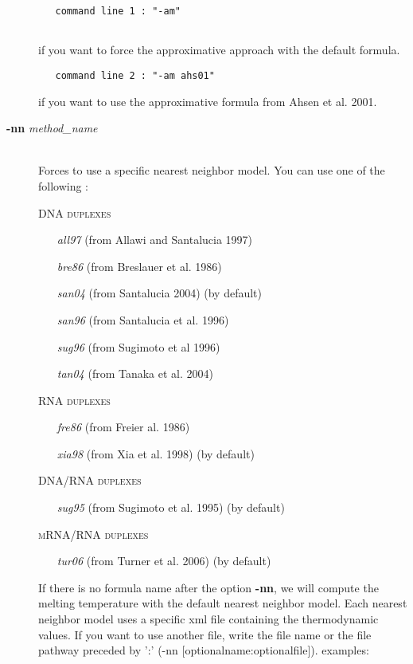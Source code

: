 \documentclass{article}
\begin{document}
\begin{description}
  \begin{verbatim}
   command line 1 : "-am" 
  
  \end{verbatim}	  
  if you want to force the approximative approach with the 
  default formula.
  
  \begin{verbatim}
   command line 2 : "-am ahs01" 
  \end{verbatim}
  	  
  if you want to use the approximative formula from 
  Ahsen et al. 2001.
    	
\item [\textbf{-nn} \textit{method\_name}]\mbox{}\\ 
  Forces to use a specific nearest neighbor model. You can use one of the following :
  
  \textsc{DNA duplexes}
    \begin{itemize}
    \item [\textit{all97}] (from Allawi and Santalucia 1997)
    \item [\textit{bre86}] (from Breslauer et al. 1986)
    \item [\textit{san04}] (from Santalucia 2004)  (by default)
    \item [\textit{san96}] (from Santalucia et al. 1996)
    \item [\textit{sug96}] (from Sugimoto et al 1996)
    \item [\textit{tan04}] (from Tanaka et al. 2004)		 
    \end{itemize}
  \textsc{RNA duplexes}
    \begin{itemize}
    \item [\textit{fre86}] (from Freier al. 1986)
    \item [\textit{xia98}] (from Xia et al. 1998)  (by default)		 
    \end{itemize}
  \textsc{DNA/RNA duplexes}
    \begin{itemize}
    \item [\textit{sug95}] (from Sugimoto et al. 1995)  (by default)
    \end{itemize}
  \textsc{mRNA/RNA duplexes}
    \begin{itemize}
    \item [\textit{tur06}] (from Turner et al. 2006)  (by default)
    \end{itemize}
  If there is no formula name after the option \textbf{-nn}, we will compute the melting temperature with the default nearest neighbor model. 
  Each nearest neighbor model uses a specific xml file containing the thermodynamic values. If you want to use another file, write the file name or the file pathway preceded by ':' (-nn [optionalname:optionalfile]).
  examples:
     

\end{description}
\end{document}
